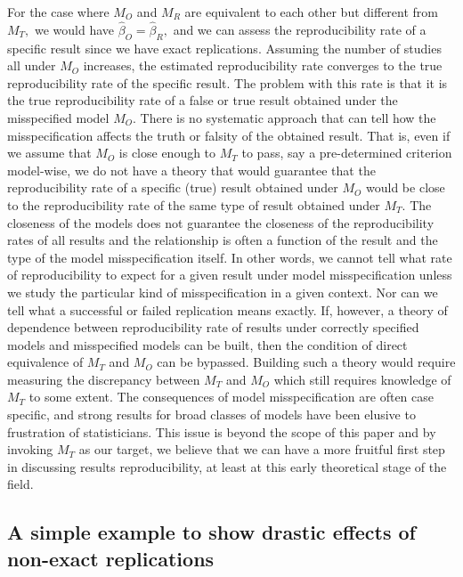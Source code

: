 \documentclass[meta,authordate,issue]{jote-new-article}
\newcounter{result}
\begin{document}
For the case where $M_O$ and $M_R$ are equivalent to each other but different from $M_T,$ we would have $\hat{\beta}_{O}=\hat{\beta}_{R},$ and we can assess the reproducibility rate of a specific result since we have exact replications. Assuming the number of studies all under $M_O$ increases, the estimated reproducibility rate converges to the true reproducibility rate of the specific result. The problem with this rate is that it is the true reproducibility rate of a false or true result obtained under the misspecified model $M_O.$ There is no systematic approach that can tell how the misspecification affects the truth or falsity of the obtained result. That is, even if we assume that $M_O$ is close enough to $M_T$ to pass, say a pre-determined criterion model-wise, we do not have a theory that would guarantee that the reproducibility rate of a specific (true) result obtained under $M_O$ would be close to the reproducibility rate of the same type of result obtained under $M_T.$ The closeness of the models does not guarantee the closeness of the reproducibility rates of all results and the relationship is often a function of the result and the type of the model misspecification itself. In other words, we cannot tell what rate of reproducibility to expect for a given result under model misspecification unless we study the particular kind of misspecification in a given context. Nor can we tell what a successful or failed replication means exactly. If, however, a theory of dependence between reproducibility rate of results under correctly specified models and misspecified models can be built, then the condition of direct equivalence of $M_T$ and $M_O$ can be bypassed. Building such a theory would require measuring the discrepancy between $M_T$ and $M_O$ which still requires knowledge of $M_T$ to some extent. The consequences of model misspecification are often case specific, and strong results for broad classes of models have been elusive to frustration of statisticians. This issue is beyond the scope of this paper and by invoking $M_T$ as our target, we believe that we can have a more fruitful first step in discussing results reproducibility, at least at this early theoretical stage of the field.



\newpage
\subsection{A simple example to show drastic effects of non-exact replications}
\end{document}
